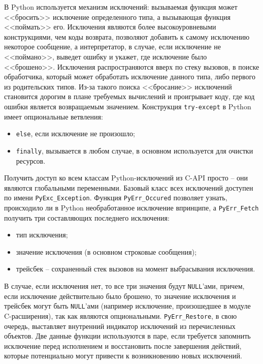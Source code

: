 В Python используется механизм исключений: вызываемая функция может <<бросить>> исключение определенного типа,
а вызывающая функция <<поймать>> его. Исключения являются более высокоуровневыми конструкциями, чем
коды возврата, позволяют добавить к самому исключению некоторое сообщение, а интерпретатор, в случае,
если исключение не <<поймано>>, выведет ошибку и укажет, где исключение было <<брошено>>.
Исключения распространяются вверх по стеку вызовов, в поиске обработчика, который может
обработать исключение данного типа, либо первого из родительских типов.
Из-за такого поиска <<бросание>> исключений становится дорогим в плане требуемых вычислений и
проигрывает коду, где код ошибки является возвращаемым значением.
Конструкция \texttt{try-except} в Python имеет опциональные ветвления:
\begin{itemize}
    \item \texttt{else}, если исключение не произошло;
    \item \texttt{finally}, вызывается в любом случае, в основном используется для очистки ресурсов.
\end{itemize}

Получить доступ ко всем классам Python-исключений из C-API просто -- они являются глобальными переменными.
Базовый класс всех исключений доступен по имени \texttt{PyExc\_Exception}.
Функция \texttt{PyErr\_Occured} позволяет узнать, происходило ли в Python необработанное исключение
впринципе, а \texttt{PyErr\_Fetch} получить три составляющих последнего исключения:
\begin{itemize}
    \item тип исключения;
    \item значение исключения (в основном строковые сообщения);
    \item трейсбек -- сохраненный стек вызовов на момент выбрасывания исключения.
\end{itemize}

В случае, если исключения нет, то все три значения будут \texttt{NULL}'ами,
причем, если исключение действительно было брошено, то значение
исключения и трейсбек могут быть \texttt{NULL}'ами (например исключение, произошедшее
в модуле C-расширения), так как являются опциональными.
\texttt{PyErr\_Restore}, в свою очередь, выставляет внутренний индикатор
исключений из перечисленных объектов.
Две данные функции используются в паре, если требуется запомнить исключение
перед исполнением и восстановить после завершения действий,
которые потенциально могут привести к возникновению новых исключений.

